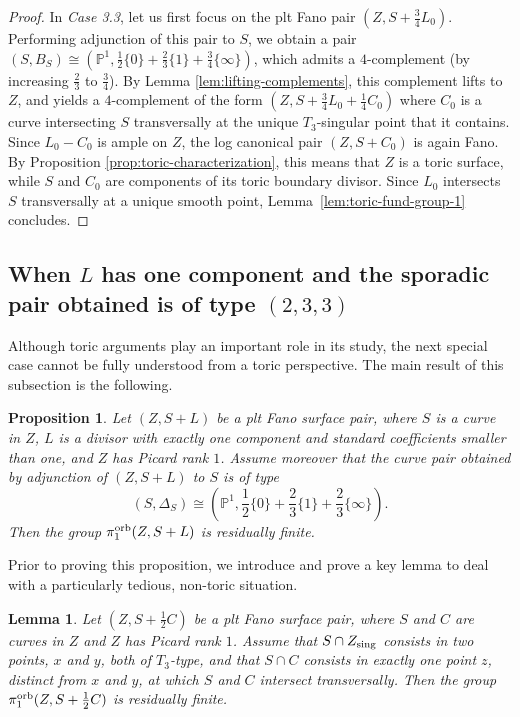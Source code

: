 \documentclass{amsart}
\newcommand{\pp}{\mathbb{P}}
\newtheorem{lemma}[theorem]{Lemma}
\newtheorem{proposition}[theorem]{Proposition}
\theoremstyle{definition}
\theoremstyle{remark}
\numberwithin{equation}{section}
\begin{document}
\begin{proof}
In {\it Case 3.3}, let us first focus on the plt Fano pair $(Z,S+\frac{3}{4}L_0)$. Performing adjunction of this pair to $S$, we obtain a pair $(S,B_S)\cong (\pp^1,\frac{1}{2}\{0\}+\frac{2}{3}\{1\}+\frac{3}{4}\{\infty\})$, which admits a $4$-complement (by increasing $\frac{2}{3}$ to $\frac{3}{4}$). By Lemma \ref{lem:lifting-complements}, this complement lifts to $Z$, and yields a $4$-complement of the form $(Z,S+\frac{3}{4}L_0+\frac{1}{4}C_0)$ where $C_0$ is a curve intersecting $S$ transversally at the unique $T_3$-singular point that it contains. Since $L_0-C_0$ is ample on $Z$, the log canonical pair $(Z,S+C_0)$ is again Fano. By Proposition \ref{prop:toric-characterization}, this means that $Z$ is a toric surface, while $S$ and $C_0$ are components of its toric boundary divisor. Since $L_0$ intersects $S$ transversally at a unique smooth point, Lemma~\ref{lem:toric-fund-group-1} concludes.
\end{proof}

\subsection{When $L$ has one component and the sporadic pair obtained is of type $(2,3,3)$}

Although toric arguments play an important role in its study, the next special case cannot be fully understood from a toric perspective. The main result of this subsection is the following.

\begin{proposition}\label{prop:1comp-sporadic233}
Let $(Z,S+L)$ be a plt Fano surface pair, where
$S$ is a curve in $Z$, $L$ is a divisor with exactly one component and standard coefficients smaller than one, and $Z$ has Picard rank $1$. Assume moreover 
that the curve pair obtained by adjunction of $(Z,S+L)$ to $S$ is of type
$$(S,\Delta_S)\cong \left(\pp^1,\frac{1}{2}\{0\}+\frac{2}{3}\{1\}+\frac{2}{3}\{\infty\}\right).$$
Then the group $\pi_1^{\rm orb}(Z,S+L)$ is residually finite.
\end{proposition}

Prior to proving this proposition, we introduce and prove a key lemma to deal with a particularly tedious, non-toric situation.


\begin{lemma}\label{lem:t3-t3}
Let $(Z,S+\frac{1}{2}C)$ be a plt Fano surface pair, where
$S$ and $C$ are curves in $Z$ and $Z$ has Picard rank $1$. %
Assume that $S\cap Z_{\rm sing}$ consists in two points, $x$ and $y$, both of $T_3$-type, and that $S\cap C$ consists in exactly one point $z$, distinct from $x$ and $y$, at which $S$ and $C$ intersect transversally.
Then the group $\pi_1^{\rm orb}(Z,S+\frac{1}{2}C)$ is residually finite.
\end{lemma}
\end{document}
